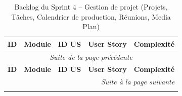 
\begin{longtable}{|c|c|c|p{7.2cm}|c|}
\caption{Backlog du Sprint 4 -- Gestion de projet (Projets, Tâches, Calendrier de production, Réunions, Media Plan)} \label{tab:backlog-sprint-4} \\
\hline
\textbf{ID} & \textbf{Module} & \textbf{ID US} & \textbf{User Story} & \textbf{Complexité} \\
\hline
\endfirsthead

\multicolumn{5}{c}{\textit{Suite de la page précédente}} \\
\hline
\textbf{ID} & \textbf{Module} & \textbf{ID US} & \textbf{User Story} & \textbf{Complexité} \\
\hline
\endhead

\hline \multicolumn{5}{r}{\textit{Suite à la page suivante}} \\
\endfoot

\hline
\endlastfoot


\end{longtable}
